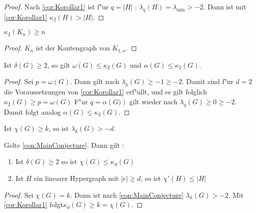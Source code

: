 \begin{proof}
    Nach \ref{cor:Korollar1} ist f"ur $q=\left|H\right|$ : $\lambda_q(H)=\lambda_{\text{min}}> -2$. Dann ist mit \ref{cor:Korollar1} $\kappa_{2}\left( H \right) > \left| H\right|$.
\end{proof}

\begin{corollary}[Klotz]
    $\kappa_{2}\left( K_n \right) \geq n$
\end{corollary}

\begin{proof}
    $K_n$ ist der Kantengraph von $K_{1,n}$.
\end{proof}
\begin{corollary}
    Ist $\delta\left( G \right) \geq 2$, so gilt $\omega\left( G \right)\leq \kappa_{2}\left( G \right)$ und $\alpha\left( G \right)\leq \kappa_{2}\left( G \right)$.
\end{corollary}

\begin{proof}
    Sei $p = \omega(G)$. Dann gilt nach $\lambda_{p}\left( G \right)\geq -1\geq -2$. Damit sind f"ur $d=2$ die Voraussetzungen von \ref{cor:Korollar1} erf"ullt, und es gilt folglich $\kappa_{2}\left( G \right)\geq p = \omega\left( G \right)$ 
    F"ur $q=\alpha\left( G) \right)$ gilt wieder nach $\lambda_{q}\left( G \right)\geq 0 \geq -2$. Damit folgt analog $\alpha\left( G \right) \leq \kappa_{2}\left( G \right)$.
\end{proof}
\begin{conjecture}
    \label{con:MainConjecture}
    Ist $\chi\left( G \right) \geq k$, so ist $\lambda_k\left( G \right) > -d$.
\end{conjecture}

\begin{theorem}
    \label{thm:MainTheorem}
    Gelte \ref{con:MainConjecture}. Dann gilt :
    \begin{enumerate}[label=(\roman*)]
        \item Ist $\delta\left( G \right) \geq 2$ so ist $\chi\left( G \right)\leq \kappa_{d}\left( G \right)$
        \item  Ist $H$ ein linearer Hypergraph mit $\left|e\right| \geq d$, so ist $\chi'\left( H \right)\leq \left|H\right| $
    \end{enumerate}
\end{theorem}

\begin{proof}
    Sei $\chi(G) = k$. Dann ist nach \ref{con:MainConjecture} $\lambda_{k}\left( G \right) > -2$. Mit \ref{cor:Korollar1} folgt$\kappa_{d}\left( G \right) \geq k = \chi\left( G \right)$.
\end{proof}
